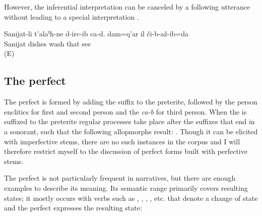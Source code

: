 However, the inferential interpretation can be canceled by a following utterance without leading to a special interpretation .

\begin{exe}
	\ex	\label{ex:Sanijat has washed the dishes. I saw it myself}
	\gll	Sanijat-li 	t'alaˁħ-ne	d-irc-ib ca-d.	dam=q'ar	il	či-b-až-ib=da\\
		Sanijat	dishes	wash 		that	see\\
	\glt	{} (E)
\end{exe}





\subsection{The perfect}
\label{ssec:The perfect}

The perfect is formed by adding the  suffix to the preterite, followed by the person enclitics for first and second person and the  \textit{ca-b} for third person. When the  is suffixed to the preterite regular  processes take place after the suffixes that end in a sonorant, such that the following allopmorphs result: . Though it can be elicited with imperfective stems, there are no such instances in the corpus and I will therefore restrict myself to the discussion of perfect forms built with perfective stems.

The perfect is not particularly frequent in narratives, but there are enough examples to describe its meaning. Its semantic range primarily covers resulting states; it mostly occurs with verbs such as , , , , etc. that denote a change of state and the perfect expresses the resulting state:

